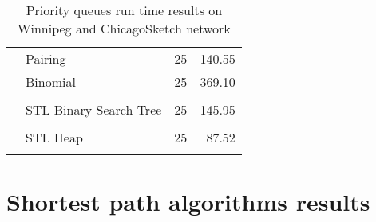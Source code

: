 \begin{table}[H]
{\begin{tabular}{l l r r}
                      & Pairing                 & 25  & 140.55\\
                      & Binomial                & 25  & 369.10\\ \\
                      & STL Binary Search Tree  & 25  & 145.95\\ \\
                      & STL Heap                & 25  & 87.52\\ \\
        \bottomrule
     \end{tabular}
     \caption{Priority queues run time results on Winnipeg and ChicagoSketch network}
     \label{table:pqresults}
 }
\end{table}

\chapter{Shortest path algorithms results}
